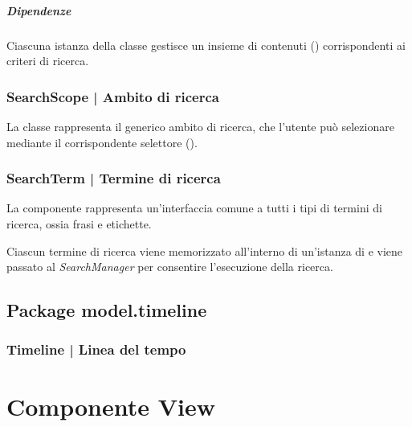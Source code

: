\documentclass[10pt,a4paper,headinclude,footinclude,hidelinks]{scrreprt} %
\begin{document}
	\paragraph{Dipendenze} Ciascuna istanza della classe gestisce un insieme di contenuti (\textit{}) corrispondenti ai criteri di ricerca.

	\subsection[SearchScope]{SearchScope | Ambito di ricerca}
	\label{sec:stage:design:sistema:model.search:search-scope}
	La classe rappresenta il generico ambito di ricerca, che l'utente può selezionare mediante il corrispondente selettore (\textit{}).

	\subsection[SearchTerm]{SearchTerm | Termine di ricerca}
	\label{sec:stage:design:sistema:model.search:search-term}
	La componente rappresenta un'interfaccia comune a tutti i tipi di termini di ricerca, ossia frasi e etichette.

	Ciascun termine di ricerca viene memorizzato all'interno di un'istanza di \textit{} e viene passato al \textit{SearchManager} per consentire l'esecuzione della ricerca.

	\section{Package model.timeline}
	\label{sec:stage:design:sistema:model.timeline}

	\subsection[Timeline]{Timeline | Linea del tempo}
	\label{sec:stage:design:sistema:model.timeline:timeline}

	\chapter{Componente View}
	\label{ch:stage:design:view}
\end{document}
